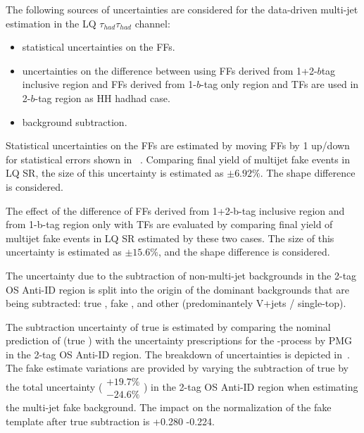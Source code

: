The following sources of uncertainties are considered for the data-driven multi-jet estimation in the LQ $\tau_{had}\tau_{had}$ channel: %
\begin{itemize}
\item statistical uncertainties on the FFs.
\item uncertainties on the difference between using FFs derived from 1+2-$b$tag inclusive region and FFs derived from 1-$b$-tag only region and TFs are used in 2-$b$-tag region as HH hadhad case.
\item background subtraction.
\end{itemize}

Statistical uncertainties on the FFs are estimated by moving FFs by 1 up/down for statistical errors shown in ~.
Comparing final yield of multijet fake events in LQ \hadhad SR, the size of this uncertainty is estimated as $\pm 6.92 \%$. The shape difference is considered.

The effect of the difference of FFs derived from 1+2-b-tag inclusive region and from 1-b-tag region only with TFs are evaluated
by comparing final yield of multijet fake events in LQ \hadhad SR estimated by these two cases. The size of this uncertainty is estimated as 
$\pm 15.6 \%$, and the shape difference is considered.

The uncertainty due to the subtraction of non-multi-jet backgrounds in the 2-tag OS Anti-ID region is split into the origin of
the dominant backgrounds that are being subtracted: true \tauhad \ttbar, fake \tauhad \ttbar, and other (predominantely V+jets / single-top).

The subtraction uncertainty of true \tauhad \ttbar is estimated by comparing the nominal prediction of \ttbar (true \tauhad) with
the uncertainty prescriptions for the \ttbar-process by PMG in the 2-tag OS Anti-ID region. The breakdown of uncertainties is depicted in~. The fake estimate variations are provided by varying the subtraction of 
true \tauhad \ttbar by the total uncertainty ($\substack{+19.7 \% \\ -24.6 \%}$) in the 2-tag OS Anti-ID region when estimating the multi-jet 
fake background. The impact on the normalization of the fake template after true \tauhad \ttbar subtraction is +0.280 -0.224.

